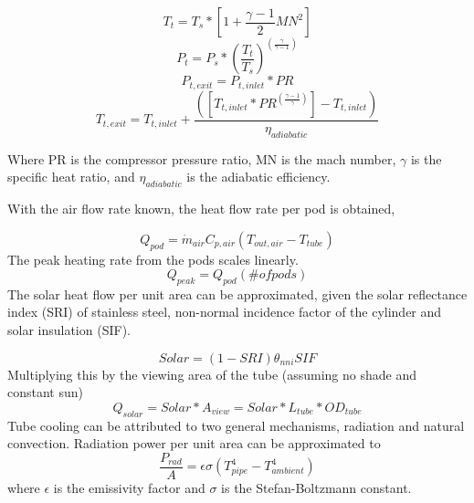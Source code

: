 \documentclass[heading.tex]{subfiles}
\begin{document}
\begin{equation*}
T_{t} = T_{s} * [1 + \frac{\gamma -1}{2} MN^2]
\end{equation*}
\begin{equation*}
P_{t} = P_{s} * (\frac{ T_{t}}{T_{s}})^(\frac{\gamma}{\gamma -1})
\end{equation*}
\begin{equation*}
P_{t,exit} = P_{t,inlet} * PR
\end{equation*}
\begin{equation*}
T_{t,exit} = T_{t,inlet} + \frac{([T_{t,inlet}*PR^{(\frac{\gamma-1}{\gamma})}] - T_{t,inlet})}  {{\eta}_{adiabatic}}
\end{equation*}

Where PR is the compressor pressure ratio, MN is the mach number,  $\gamma$ is the specific heat ratio, and  ${\eta}_{adiabatic}$ is the
adiabatic efficiency.

With the air flow rate known, the heat flow rate per pod is obtained,

\begin{equation*}
{Q}_{pod}= \dot{m}_{air} C_{p,air} (T_{out, air} - T_{tube})
\end{equation*}
The peak heating rate from the pods scales linearly.
\begin{equation*}
{Q}_{peak}= Q_{pod} (\# ofpods)
\end{equation*}
The solar heat flow per unit area can be approximated, given the solar reflectance index (SRI) of stainless steel, non-normal incidence factor
of the cylinder and solar insulation (SIF).


\begin{equation*}
Solar = (1-SRI) {\theta}_{nni} SIF
\end{equation*}
Multiplying this by the viewing area of the tube (assuming no shade and constant sun)
\begin{equation*}
Q_{solar} = Solar * A_{view} = Solar * L_{tube} * OD_{tube}
\end{equation*}
Tube cooling can be attributed to two general mechanisms, radiation and natural convection. Radiation power per unit area can be
approximated to
\begin{equation*}
\frac{P_{rad}}{A} = \epsilon \sigma (T_{pipe}^4 - T_{ambient}^4)
\end{equation*}
where  $\epsilon$ is the emissivity factor and  $\sigma$ is the Stefan-Boltzmann constant.
\end{document}
